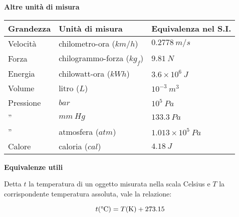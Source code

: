\begin{center}
	\textbf{Altre unità di misura}
\end{center}

\begin{table}[!h]
	\centering
	\begin{tabular}{l|l|l}
		\hline
		\textbf{Grandezza} & \textbf{Unità di misura} & \textbf{Equivalenza nel S.I.} \\
		\hline
		Velocità & chilometro-ora ($\displaystyle km/h$) & $\displaystyle 0.2778\ m/s$ \\
		Forza & chilogrammo-forza ($\displaystyle kg_f$) & $\displaystyle 9.81\ N$ \\
		Energia & chilowatt-ora ($\displaystyle kWh$) & $\displaystyle 3.6\times 10^6 \ J$ \\
		Volume & litro ($\displaystyle L$) & $\displaystyle 10^{-3} \ m^3$ \\
		Pressione & $\displaystyle bar$ & $\displaystyle 10^5 \ Pa$ \\
		'' & $\displaystyle mm\ Hg$ & $\displaystyle 133.3\ Pa$ \\
		'' & atmosfera ($\displaystyle atm$) & $\displaystyle 1.013\times 10^5 \ Pa$ \\
		Calore & caloria ($\displaystyle cal$) & $\displaystyle 4.18\ J$ \\
	\end{tabular}
\end{table}

\begin{center}
	\textbf{Equivalenze utili}
\end{center}

Detta $\displaystyle t$ la temperatura di un oggetto misurata nella scala Celsius e $\displaystyle T$ la corrispondente temperatura assoluta, vale la relazione:

\begin{equation*}
	t( \degree \text{C}) =T(\text{K}) +273.15
\end{equation*}